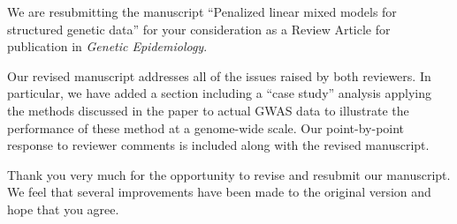\documentclass{uiletter}
\begin{document}

We are resubmitting the manuscript ``Penalized linear mixed models for structured genetic data'' for your consideration as a Review Article for publication in {\em Genetic Epidemiology}.

Our revised manuscript addresses all of the issues raised by both reviewers.  In particular, we have added a section including a ``case study'' analysis applying the methods discussed in the paper to actual GWAS data to illustrate the performance of these method at a genome-wide scale.  Our point-by-point response to reviewer comments is included along with the revised manuscript.

Thank you very much for the opportunity to revise and resubmit our manuscript.  We feel that several improvements have been made to the original version and hope that you agree.

\EndLetter
\end{document}

